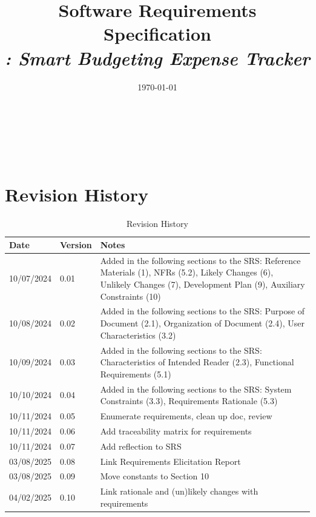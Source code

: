 \documentclass[12pt]{article}
\begin{document}
\title{Software Requirements Specification \\ \textit{\progname: Smart Budgeting Expense Tracker}} 
\author{\authname}
\date{\today}
	
\maketitle

~\newpage


\tableofcontents

\listoftables

~\newpage

\section*{Revision History}

\begin{table}[h!]
\centering
\caption{Revision History}
\begin{tabularx}{\textwidth}{p{3cm}p{2cm}X}
\toprule {\bf Date} & {\bf Version} & {\bf Notes}\\
\midrule
10/07/2024 & 0.01 & Added in the following sections to the SRS: Reference Materials (1), NFRs (5.2), Likely Changes (6), Unlikely Changes (7), Development Plan (9), Auxiliary Constraints (10)\\
10/08/2024 & 0.02 & Added in the following sections to the SRS: Purpose of Document (2.1), Organization of Document (2.4), User Characteristics (3.2)\\
10/09/2024 & 0.03 & Added in the following sections to the SRS: Characteristics of Intended Reader (2.3), Functional Requirements (5.1)\\
10/10/2024 & 0.04 & Added in the following sections to the SRS: System Constraints (3.3), Requirements Rationale (5.3)\\
10/11/2024 & 0.05 & Enumerate requirements, clean up doc, review\\
10/11/2024 & 0.06 & Add traceability matrix for requirements\\
10/11/2024 & 0.07 & Add reflection to SRS\\
03/08/2025 & 0.08 & Link Requirements Elicitation Report\\
03/08/2025 & 0.09 & Move constants to Section 10\\
04/02/2025 & 0.10 & Link rationale and (un)likely changes with requirements\\
\bottomrule 
\end{tabularx}
\end{table}
\end{document}
